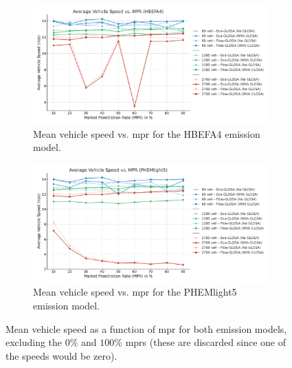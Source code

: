 \begin{figure}[htbp]
  \centering
  \begin{subfigure}[b]{0.98\textwidth}
    \includegraphics[width=\textwidth]{data/img/AverageVehicleSpeed/AvgSpeedHBEFA4Combined.pdf}
    \caption{Mean vehicle speed vs. \ac{mpr} for the HBEFA4 emission model.}
    \label{fig:MeanSpeed_HBEFA4_all}
  \end{subfigure}
  \begin{subfigure}[b]{0.98\textwidth}
    \includegraphics[width=\textwidth]{data/img/AverageVehicleSpeed/AvgSpeedPHEMlight5Combined.pdf}
    \caption{Mean vehicle speed vs. \ac{mpr} for the PHEMlight5 emission model.}
    \label{fig:MeanSpeed_PHEM_all}
  \end{subfigure}
  \caption[Mean vehicle speed vs. \ac{mpr} for both emission models]{Mean vehicle speed as a function of \ac{mpr} for both emission models, excluding the $0\%$ and $100\%$ \acp{mpr} (these are discarded since one of the speeds would be zero).}
  \label{fig:MeanSpeed_Combined}
\end{figure}

